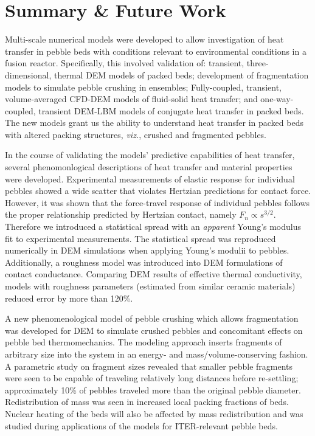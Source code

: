 \chapter{Summary \& Future Work}\label{sec:summary}
Multi-scale numerical models were developed to allow investigation of heat transfer in pebble beds with conditions relevant to environmental conditions in a fusion reactor. Specifically, this involved validation of: transient, three-dimensional, thermal DEM models of packed beds; development of fragmentation models to simulate pebble crushing in ensembles; Fully-coupled, transient, volume-averaged CFD-DEM models of fluid-solid heat transfer; and one-way-coupled, transient DEM-LBM models of conjugate heat transfer in packed beds. The new models grant us the ability to understand heat transfer in packed beds with altered packing structures, \textit{viz.}, crushed and fragmented pebbles. 

In the course of validating the models' predictive capabilities of heat transfer, several phenomonlogical descriptions of heat transfer and material properties were developed. Experimental measurements of elastic response for individual pebbles showed a wide scatter that violates Hertzian predictions for contact force. However, it was shown that the force-travel response of individual pebbles follows the proper relationship predicted by Hertzian contact, namely $F_n \propto s^{3/2}$. Therefore we introduced a statistical spread with an \textit{apparent} Young's modulus fit to experimental measurements. The statistical spread was reproduced numerically in DEM simulations when applying Young's modulii to pebbles. Additionally, a roughness model was introduced into DEM formulations of contact conductance. Comparing DEM results of effective thermal conductivity, models with roughness parameters (estimated from similar ceramic materials) reduced error by more than 120\%. 

A new phenomenological model of pebble crushing which allows fragmentation was developed for DEM to simulate crushed pebbles and concomitant effects on pebble bed thermomechanics. The modeling approach inserts fragments of arbitrary size into the system in an energy- and mass/volume-conserving fashion. A parametric study on fragment sizes revealed that smaller pebble fragments were seen to be capable of traveling relatively long distances before re-settling; approximately 10\% of pebbles traveled more than the original pebble diameter. Redistribution of mass was seen in increased local packing fractions of beds. Nuclear heating of the beds will also be affected by mass redistribution and was studied during applications of the models for ITER-relevant pebble beds.

